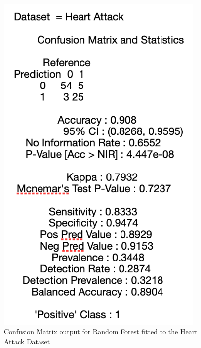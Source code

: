 \begin{figure}[!htbp]
\begin{minipage}{0.45\textwidth}
        \includegraphics[width=0.9\textwidth]{ThesisTemplate/appendix/images/Chapter5Appendix/ConfusionMatrix/HeartAttack.png} 
        \caption{Confusion Matrix output for Random Forest fitted to the Heart Attack Dataset}
        \label{fig:matrixHA}
    \end{minipage}
\end{figure}


